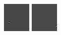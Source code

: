 \begin{figure}[ht]
\begin{center}
  \includegraphics[width=\columnwidth/11]{ch5/figures/6_Scaling_M.png}
  \includegraphics[width=\columnwidth/11]{ch5/figures/7_Scaling_M.png}

\end{center}
\end{figure}
